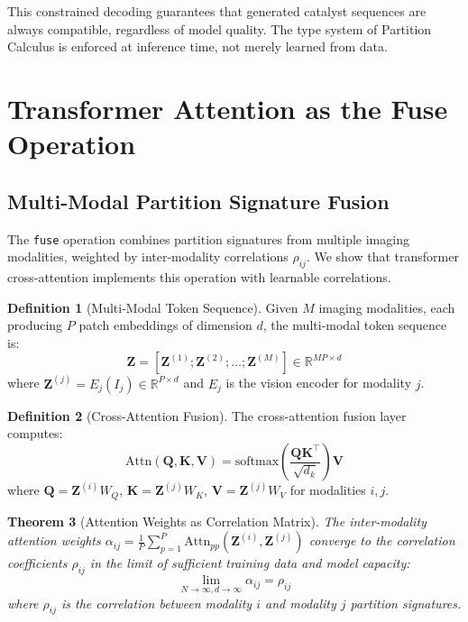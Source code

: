 \documentclass[11pt,a4paper]{article}
\newtheorem{theorem}{Theorem}[section]
\theoremstyle{definition}
\newtheorem{definition}[theorem]{Definition}
\theoremstyle{remark}
\newcommand{\R}{\mathbb{R}}
\begin{document}
This constrained decoding guarantees that generated catalyst sequences are always compatible, regardless of model quality. The type system of Partition Calculus is enforced at inference time, not merely learned from data.

\section{Transformer Attention as the Fuse Operation}
\label{sec:fusion}

\subsection{Multi-Modal Partition Signature Fusion}

The \texttt{fuse} operation combines partition signatures from multiple imaging modalities, weighted by inter-modality correlations $\rho_{ij}$. We show that transformer cross-attention implements this operation with learnable correlations.

\begin{definition}[Multi-Modal Token Sequence]
Given $M$ imaging modalities, each producing $P$ patch embeddings of dimension $d$, the multi-modal token sequence is:
\begin{equation}
\mathbf{Z} = [\mathbf{Z}^{(1)}; \mathbf{Z}^{(2)}; \ldots; \mathbf{Z}^{(M)}] \in \R^{MP \times d}
\end{equation}
where $\mathbf{Z}^{(j)} = E_j(I_j) \in \R^{P \times d}$ and $E_j$ is the vision encoder for modality $j$.
\end{definition}

\begin{definition}[Cross-Attention Fusion]
The cross-attention fusion layer computes:
\begin{equation}
\text{Attn}(\mathbf{Q}, \mathbf{K}, \mathbf{V}) = \text{softmax}\left(\frac{\mathbf{Q}\mathbf{K}^\top}{\sqrt{d_k}}\right)\mathbf{V}
\end{equation}
where $\mathbf{Q} = \mathbf{Z}^{(i)} W_Q$, $\mathbf{K} = \mathbf{Z}^{(j)} W_K$, $\mathbf{V} = \mathbf{Z}^{(j)} W_V$ for modalities $i, j$.
\end{definition}

\begin{theorem}[Attention Weights as Correlation Matrix]
\label{thm:attention_correlation}
The inter-modality attention weights $\alpha_{ij} = \frac{1}{P} \sum_{p=1}^{P} \text{Attn}_{pp}(\mathbf{Z}^{(i)}, \mathbf{Z}^{(j)})$ converge to the correlation coefficients $\rho_{ij}$ in the limit of sufficient training data and model capacity:
\begin{equation}
\lim_{N \to \infty, d \to \infty} \alpha_{ij} = \rho_{ij}
\end{equation}
where $\rho_{ij}$ is the correlation between modality $i$ and modality $j$ partition signatures.
\end{theorem}
\end{document}
